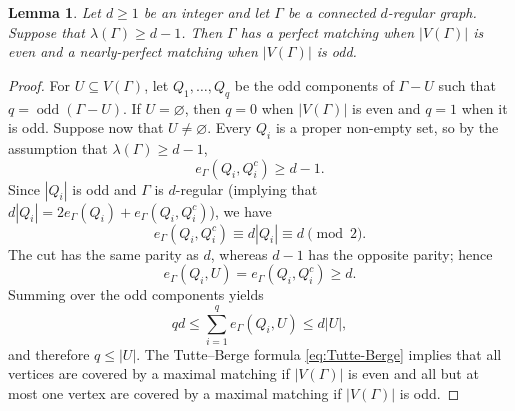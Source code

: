 \documentclass[10pt,a4paper]{article}
\newtheorem{lemma}[thm]{Lemma}
\newcommand{\odd}{\operatorname{odd}}
\begin{document}
\begin{lemma}\label{lem:regular-matching}
Let $d \geq 1$ be an integer and let $\Gamma$ be a connected $d$-regular graph. Suppose that $\lambda(\Gamma)\ge d-1$.
Then $\Gamma$ has a perfect matching when $|V(\Gamma)|$ is even and a nearly-perfect matching when $|V(\Gamma)|$ is odd.
\end{lemma}

\begin{proof}
For $U\subseteq V(\Gamma)$, let $Q_1,\ldots,Q_q$ be the odd components of $\Gamma-U$ such that $q=\odd(\Gamma - U)$.
If $U=\varnothing$, then $q=0$ when $|V(\Gamma)|$ is even and $q=1$ when it is odd.
Suppose now that $U\ne\varnothing$.
Every $Q_i$ is a proper non-empty set, so by the assumption that $\lambda(\Gamma)\geq d-1$,
\[
  e_\Gamma(Q_i,Q_i^c)\ge d-1.
\]
Since $|Q_i|$ is odd and $\Gamma$ is $d$-regular (implying that $d|Q_i|= 2 e_{\Gamma}(Q_i) + e_{\Gamma}(Q_i, Q_i^c)$), we have
\[
  e_\Gamma(Q_i,Q_i^c)\equiv d|Q_i|\equiv d\pmod 2.
\]
The cut has the same parity as $d$, whereas $d-1$ has the opposite parity; hence
\[
  e_\Gamma(Q_i,U)=e_\Gamma(Q_i,Q_i^c)\ge d.
\]
Summing over the odd components yields
\[
  qd\le\sum_{i=1}^q e_\Gamma(Q_i,U)\le d|U|,
\]
and therefore $q\le|U|$.
The Tutte--Berge formula \eqref{eq:Tutte-Berge} implies that all vertices are covered by a maximal matching if $|V(\Gamma)|$ is even and all but at most one vertex are covered by a maximal matching if $|V(\Gamma)|$ is odd.
\end{proof}
\end{document}
